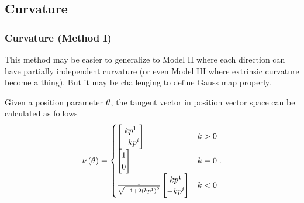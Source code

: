\documentclass[stu, babel, american, biblatex, a4paper, draftall]{apa7}
\begin{document}
\subsection{Curvature}
\subsubsection{Curvature (Method I)}
This method may be easier to generalize to
Model II where each direction can have partially independent curvature
(or even Model III where extrinsic curvature become a thing).
But it may be challenging to define Gauss map properly.
\begin{lemma}\label{Model:NormalVector}
    Given a position parameter $\tensor{\theta}{}$,
    the tangent vector in position vector space can be calculated as follows
    \begin{equation*}
        \nu\left(\tensor{\theta}{}\right)
        =
        \begin{cases}
            \begin{bmatrix}
                k\tensor{p}{^1}  \\
                +k\tensor{p}{^i} \\
            \end{bmatrix} & k>0 \\
            \begin{bmatrix}
                1 \\
                0 \\
            \end{bmatrix} & k=0 \\
            \frac{1}{\sqrt{-1+2\left(k\tensor{p}{^1}\right)^2}}
            \begin{bmatrix}
                k\tensor{p}{^1}  \\
                -k\tensor{p}{^i} \\
            \end{bmatrix} & k<0
        \end{cases}
        \text{.}
    \end{equation*}
\end{lemma}
\end{document}
